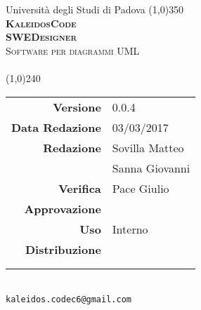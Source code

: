 \documentclass[a4paper,12pt]{article}
\author{KaleidosCode}
\date{03/03/2017}	%
\begin{document}
	\begin{titlepage}
		\centering Università degli Studi di Padova
		\line(1,0){350}\\
		\vspace{0.4cm}
		{\bfseries\scshape\LARGE KaleidosCode\\}
		\vspace{0.4cm}
		{\bfseries\scshape\LARGE SWEDesigner\\}
		{\scshape\Large Software per diagrammi UML\\}
		\vspace{1cm}
		{\scshape\Large \pianodiprogettoi\ \\}		%
		\vspace{1.4cm}
		\logo
		\vspace{1.2cm}
		\line(1,0){240}\\
		\begin{tabular}{r|l}
			{\hfill \textbf{Versione}} 			& 0.0.4\\
			{\hfill \textbf{Data Redazione}} 	& 03/03/2017\\	%
			{\hfill \textbf{Redazione}} 		& Sovilla Matteo \\ & Sanna Giovanni \\
			{\hfill \textbf{Verifica}} 			& Pace Giulio\\
			{\hfill \textbf{Approvazione}} 		& \\
			{\hfill \textbf{Uso}} 				& Interno\\
			{\hfill \textbf{Distribuzione}} 	& \vardanega \\ & \cardin \\ & \proponente\\
		\end{tabular}\\
		\vspace{2cm}
		\texttt{kaleidos.codec6@gmail.com}
	\end{titlepage}

	\pagestyle{myfront}
	\newpage
		
	\newpage
		\tableofcontents
	\pagestyle{mymain}
	\newpage
		
	\newpage
		
	\newpage
		
	\newpage
		
	\newpage
		
	\label{LastPage}
\end{document}
